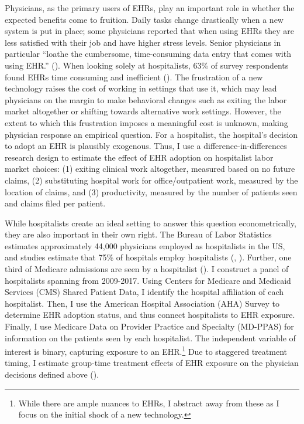 \documentclass[12pt]{article}
\begin{document}
Physicians, as the primary users of EHRs, play an important role in whether the expected benefits come to fruition. Daily tasks change drastically when a new system is put in place; some physicians reported that when using EHRs they are less satisfied with their job and have higher stress levels. Senior physicians in particular “loathe the cumbersome, time-consuming data entry that comes with using EHR.” (\cite{CollierBurnout}). When looking solely at hospitalists, 63\% of survey respondents found EHRs time consuming and inefficient (\cite{czernik2022hospitalist}). The frustration of a new technology raises the cost of working in settings that use it, which may lead physicians on the margin to make behavioral changes such as exiting the labor market altogether or shifting towards alternative work settings. However, the extent to which this frustration imposes a meaningful cost is unknown, making physician response an empirical question. For a hospitalist, the hospital's decision to adopt an EHR is plausibly exogenous. Thus, I use a difference-in-differences research design to estimate the effect of EHR adoption on hospitalist labor market choices: (1) exiting clinical work altogether, measured based on no future claims, (2) substituting hospital work for office/outpatient work, measured by the location of claims, and (3) productivity, measured by the number of patients seen and claims filed per patient.

While hospitalists create an ideal setting to answer this question econometrically, they are also important in their own right. The Bureau of Labor Statistics estimates approximately 44,000 physicians employed as hospitalists in the US, and studies estimate that 75\% of hospitals employ hospitalists (\cite{bls}, \cite{healthecareers_2022}). Further, one third of Medicare admissions are seen by a hospitalist (\cite{messler2015history}). I construct a panel of hospitalists spanning from 2009-2017. Using Centers for Medicare and Medicaid Services (CMS) Shared Patient Data, I identify the hospital affiliation of each hospitalist. Then, I use the American Hospital Association (AHA) Survey to determine EHR adoption status, and thus connect hospitalists to EHR exposure. Finally, I use Medicare Data on Provider Practice and Specialty (MD-PPAS) for information on the patients seen by each hospitalist. The independent variable of interest is binary, capturing exposure to an EHR.\footnote{While there are ample nuances to EHRs, I abstract away from these as I focus on the initial shock of a new technology.} Due to staggered treatment timing, I estimate group-time treatment effects of EHR exposure on the physician decisions defined above (\cite{callaway2021difference}).
\end{document}

